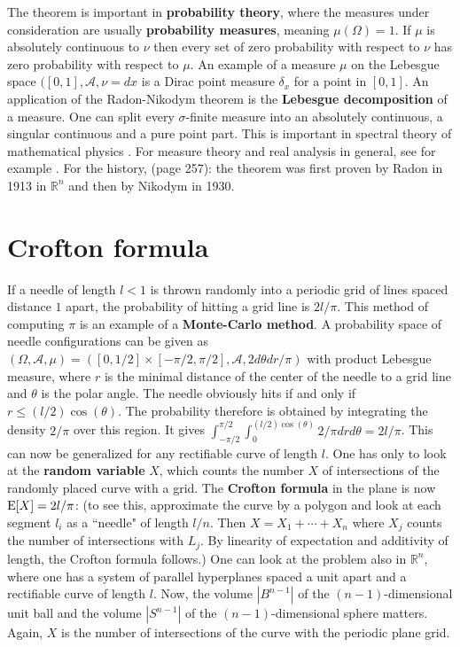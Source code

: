 \documentclass[12pt]{amsart}
\def\satz#1{ \vspace{2mm} \begin{center} \fcolorbox{yellow1}{yellow1}{ \parbox{14.0cm}{{\bf Theorem:} #1}} \vspace{2mm} \end{center} }
\newcounter{example}    \def\example#1{ \item \fontsize{12}{15} \selectfont #1 \fontsize{12}{15} \selectfont }
\begin{document}
\satz{ If $\mu<<\nu$, there exists $f \in L^1(\Omega,\mathcal{A},\nu)$ with $\mu= f \nu$. }

The theorem is important in {\bf probability theory}, where the measures under consideration
are usually {\bf probability measures}, meaning $\mu(\Omega)=1$. If $\mu$ is absolutely
continuous to $\nu$ then every set of zero probability with respect to $\nu$
has zero probability with respect to $\mu$.
An example of a measure $\mu$ on the Lebesgue space $([0,1], \mathcal{A},\nu=dx$ 
is a Dirac point measure $\delta_x$ for a point in $[0,1]$.
An application of the Radon-Nikodym theorem is the {\bf Lebesgue decomposition} of a measure.
One can split every $\sigma$-finite measure into an absolutely continuous, a singular continuous
and a pure point part. This is important in spectral theory of mathematical physics \cite{ReedSimon}.
For measure theory and real analysis in general, see for example \cite{SteinShakarchi2005}.
For the history, \cite{Simon2017} (page 257): the theorem was first proven by Radon in 1913 in
$\mathbb{R}^n$ and then by Nikodym in 1930.

\section{Crofton formula}

If a needle of length $l<1$ is thrown randomly into a periodic grid of lines
spaced distance $1$ apart, the probability of hitting a grid line is $2l/\pi$.    
This method of computing $\pi$ is an example of a {\bf Monte-Carlo method}.
A probability space of needle configurations can be given as 
$(\Omega,\mathcal{A},\mu) = ([0,1/2] \times [-\pi/2,\pi/2],\mathcal{A},2 d\theta dr/\pi)$
with product Lebesgue measure, where $r$ is the minimal distance of the center
of the needle to a grid line and $\theta$ is the polar angle. The needle 
obviously hits if and only if $r \leq (l/2) \cos(\theta)$. The probability therefore
is obtained by integrating the density $2/\pi$ over this region. It gives
$\int_{-\pi/2}^{\pi/2} \int_0^{(l/2) \cos(\theta)} 2/\pi dr d\theta = 2l/\pi$.
This can now be generalized for any rectifiable curve of length $l$. One has only to look
at the {\bf random variable} $X$, which counts the number $X$ of intersections of 
the randomly placed curve with a grid.
The {\bf Crofton formula} in the plane is now ${\rm E}[X]=2l/\pi$:
(to see this, approximate the curve by a polygon and look at each segment $l_i$ as a ``needle"
of length $l/n$. Then $X=X_1 + \cdots + X_n$ where $X_j$ counts the number of intersections
with $L_j$. By linearity of expectation and additivity of length, the Crofton formula follows.)
One can look at the problem also in $\mathbb{R}^n$, where one has a system of parallel hyperplanes spaced
a unit apart and a rectifiable curve of length $l$. 
Now, the volume $|B^{n-1}|$ of the $(n-1)$-dimensional unit ball 
and the volume $|S^{n-1}|$ of the $(n-1)$-dimensional sphere matters. 
Again, $X$ is the number of intersections of the curve with the 
periodic plane grid.
\end{document}
